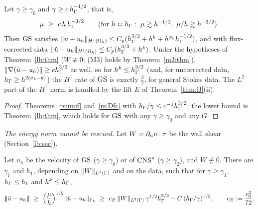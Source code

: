 \begin{corollary}\label{rs:rescue}
Let $\gamma\ge\gamma_0$ and $\gamma\ge c\,h_\Gamma^{-1/2}$, that is,
\[
\mu\ \ge\ c\,h\,h_\Gamma^{-3/2}\qquad(\text{for }h\asymp h_\Gamma:\ \mu\gtrsim h^{-1/2},\ \mu/h\gtrsim h^{-3/2}).
\]
Then $\mathrm{GS}$ satisfies $\lVert \tilde u-u_h\rVert_{H^1(\Omega_h)}\le C_p(h_\Gamma^{3/2}+h^k+h^{\sigma_k}h_\Gamma^{-1/2})$, and with flux-corrected data $\lVert \tilde u-u_h\rVert_{H^1(\Omega_h)}\le C_p(h_\Gamma^{3/2}+h^k)$. Under the hypotheses of Theorem~\ref{lb:thm} ($W\not\equiv0$; (M3) holds by Theorem~\ref{m3:thm}), $\lVert \nabla(\tilde u-u_h)\rVert\ge ch_\Gamma^{3/2}$ as well, so for $h^k\le h_\Gamma^{3/2}$ (and, for uncorrected data, $h_\Gamma\ge h^{2(\sigma_k-k)}$) the $H^1$ rate of $\mathrm{GS}$ is exactly $\frac32$, for general Stokes data. The $L^2$ part of the $H^1$ norm is handled by the lift $E$ of Theorem~\ref{thm:B}(ii).
\end{corollary}

\begin{proof}
Theorems~\ref{rs:unif} and~\ref{rs:Dfc} with $h_\Gamma/\gamma\le c^{-1}h_\Gamma^{3/2}$; the lower bound is Theorem~\ref{lb:thm}, which holds for $\mathrm{GS}$ with any $\gamma\ge\gamma_0$ and any $G$.
\end{proof}

\emph{The energy norm cannot be rescued.} Let $W=\partial_n u\cdot\tau$ be the wall shear (Section~\ref{lb:sec}).

\begin{theorem}\label{rs:elower}
Let $u_h$ be the velocity of $\mathrm{GS}$ ($\gamma\ge\gamma_0$) or of $\mathrm{CNS}^\ast$ ($\gamma\ge\gamma_2$), and $W\not\equiv0$. There are $\gamma_1$ and $h_1$, depending on $\lVert W\rVert_{L^2(\Gamma)}$ and on the data, such that for $\gamma\ge\gamma_1$, $h_\Gamma\le h_1$ and $h^k\le h_\Gamma$,
\[
\tnorm{\ut-u_h}\ \ge\ \Bigl(\frac\mu h\Bigr)^{1/2}\norm{\ut-u_h}_{\Gh}\ \ge\ c_E\,\norm{W}_{L^2(\Gamma)}\,\gamma^{1/2}\hG^{3/2}-C\,(\hG/\gamma)^{1/2},\qquad c_E:=\frac{c_0^2}{72}.
\]
\end{theorem}

